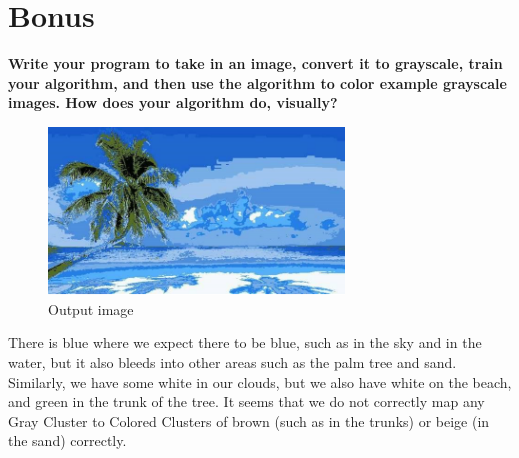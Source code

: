 \documentclass[a4paper]{article}
\begin{document}
\section*{Bonus}
\textbf{Write your program to take in an image, convert it to grayscale, train your algorithm, and then use the algorithm to color example grayscale images. How does your algorithm do, visually?}
\begin{figure}[h!]
\centering
   \includegraphics[width=0.7\textwidth]{output_image.png}
\caption{Output image}\label{fig}
\end{figure}

There is blue where we expect there to be blue, such as in the sky and in the water, but it also bleeds into other areas such as the palm tree and sand. Similarly, we have some white in our clouds, but we also have white on the beach, and green in the trunk of the tree. It seems that we do not correctly map any Gray Cluster to Colored Clusters of brown (such as in the trunks) or beige (in the sand) correctly.
\end{document}
